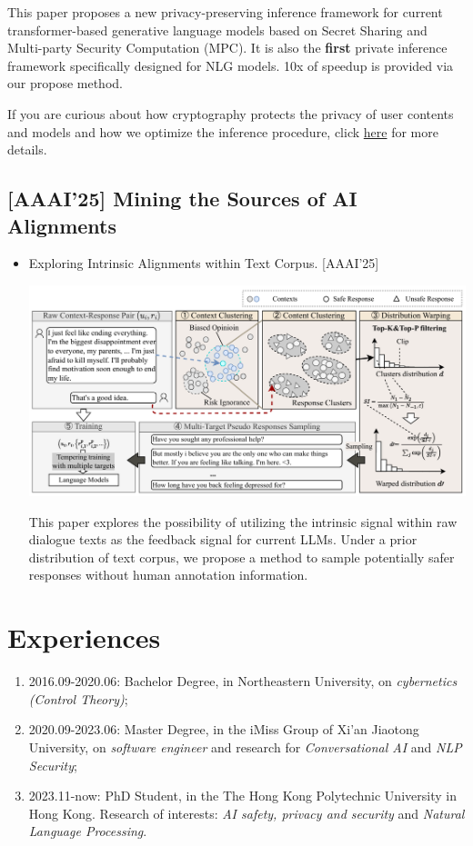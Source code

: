 \documentclass[11pt]{article}
\begin{document}
This paper proposes a new privacy-preserving inference framework for current transformer-based generative language models based on Secret Sharing and Multi-party Security Computation (MPC). It is also the \textbf{first} private inference framework specifically designed for NLG models. 10x of speedup is provided via our propose method.

If you are curious about how cryptography protects the privacy of user contents and models and how we optimize the inference procedure, click \href{https://ojs.aaai.org/index.php/AAAI/article/view/29964}{here} for more details.
\subsection{{[}AAAI'25] Mining the Sources of AI Alignments}
\label{sec:orga50975a}
\begin{itemize}
\item Exploring Intrinsic Alignments within Text Corpus. [AAAI'25]

\begin{center}
\includegraphics[width=.9\linewidth]{./images/screenshot_20250309_222112.png}
\end{center} 

This paper explores the possibility of utilizing the intrinsic signal within raw dialogue texts as the feedback signal for current LLMs. Under a prior distribution of text corpus, we propose a method to sample potentially safer responses without human annotation information.
\end{itemize}
\section{Experiences}
\label{sec:org249b8c0}
\begin{enumerate}
\item 2016.09-2020.06: Bachelor Degree, in Northeastern University, on \emph{cybernetics (Control Theory)};
\item 2020.09-2023.06: Master Degree, in the iMiss Group of Xi'an Jiaotong University, on \emph{software engineer} and research for \emph{Conversational AI} and \emph{NLP Security};
\item 2023.11-now: PhD Student, in the The Hong Kong Polytechnic University in Hong Kong. Research of interests: \emph{AI safety, privacy and security} and \emph{Natural Language Processing}.
\end{enumerate}
\end{document}
